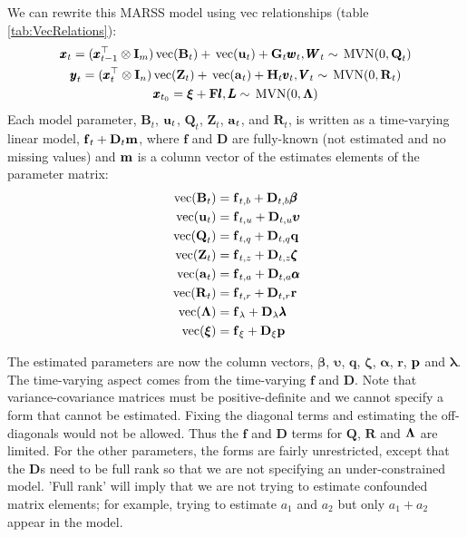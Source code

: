 \documentclass[]{article}
\def\uupsilon{\pmb{\upsilon}}
\def\llambda{\pmb{\lambda}}
\def\bbeta{\pmb{\beta}}
\def\aalpha{\pmb{\alpha}}
\def\zzeta{\pmb{\zeta}}
\def\xixi{\mbox{\boldmath $\xi$}}
\def\LAM{\mbox{\boldmath $\Lambda$}}
\def\ZZ{\mbox{$\mathbf Z$}}	\def\zz{\mbox{$\mathbf z$}}
\def\BB{\mbox{$\mathbf B$}}	\def\bb{\mbox{$\mathbf b$}}
\def\DD{\mbox{$\mathbf D$}}	\def\dd{\mbox{$\mathbf d$}}
\def\FF{\mbox{$\mathbf F$}} \def\ff{\mbox{$\mathbf f$}}
\def\GG{\mbox{$\mathbf G$}}	\def\gg{\mbox{$\mathbf g$}}
\def\HH{\mbox{$\mathbf H$}}	\def\hh{\mbox{$\mathbf h$}}
\def\II{\mbox{$\mathbf I$}} \def\ii{\mbox{$\mathbf i$}}
\def\QQ{\mbox{$\mathbf Q$}}	 \def\qq{\mbox{$\mathbf q$}}
\def\RR{\mbox{$\mathbf R$}}	 \def\rr{\mbox{$\mathbf r$}}
\def\VV{\mbox{$\pmb{V}$}}	\def\vv{\mbox{$\pmb{v}$}}
\def\WW{\mbox{$\pmb{W}$}}	\def\ww{\mbox{$\pmb{w}$}}
\def\LL{\mbox{$\pmb{L}$}}	\def\ll{\mbox{$\pmb{l}$}}
\def\vec{\,\textup{\textrm{vec}}}
\def\MVN{\,\textup{\textrm{MVN}}}
\begin{document}
We can rewrite this MARSS model using vec relationships (table \ref{tab:VecRelations}):
\begin{equation}\label{eq:MARSS.ex.vec}
\begin{gathered}
\xx_t = (\xx_{t-1}^\top \otimes \II_m)\vec(\BB_t) + \vec(\uu_t) + \GG_t\ww_t, \WW_t  \sim \MVN(0,\QQ_t)\\
\yy_t = (\xx_t^\top \otimes \II_n)\vec(\ZZ_t) + \vec(\aa_t) + \HH_t\vv_t, \VV_t \sim \MVN(0,\RR_t)\\
\xx_{t_0} = \xixi+\FF\ll, \LL \sim \MVN(0,\LAM)
\end{gathered}
\end{equation}
Each model parameter, $\BB_t$, $\uu_t$, $\QQ_t$, $\ZZ_t$, $\aa_t$, and $\RR_t$, is written as a time-varying linear model, $\ff_t+\DD_t\mm$, where $\ff$ and $\DD$ are fully-known (not estimated and no missing values) and $\mm$ is a column vector of the estimates elements of the parameter matrix:
\begin{equation}\label{eq:MARSS.ex.vec.2}
\begin{split}
\vec(\BB_t) &= \ff_{t,b} + \DD_{t,b}\bbeta\\
\vec(\uu_t) &= \ff_{t,u} + \DD_{t,u}\uupsilon\\
\vec(\QQ_t) &= \ff_{t,q} + \DD_{t,q}\qq\\
\vec(\ZZ_t) &= \ff_{t,z} + \DD_{t,z}\zzeta\\
\vec(\aa_t) &= \ff_{t,a} + \DD_{t,a}\aalpha\\
\vec(\RR_t) &= \ff_{t,r} + \DD_{t,r}\rr\\
\vec(\LAM)&= \ff_\lambda+\DD_\lambda\llambda \\
\vec(\xixi)&= \ff_\xi+\DD_\xi\pp
\end{split}
\end{equation}

The estimated parameters are now the column vectors, $\bbeta$, $\uupsilon$, $\qq$, $\zzeta$, $\aalpha$, $\rr$, $\pp$ and $\llambda$.  The time-varying aspect comes from the time-varying $\ff$ and $\DD$.  Note that variance-covariance matrices must be positive-definite and we cannot specify a form that cannot be estimated.  Fixing the diagonal terms and estimating the off-diagonals would not be allowed.  Thus the $\ff$ and $\DD$ terms for $\QQ$, $\RR$ and $\LAM$ are limited.  For the other parameters, the forms are fairly unrestricted, except that the $\DD$s need to be full rank so that we are not specifying an under-constrained model.  'Full rank' will imply that we are not trying to estimate confounded matrix elements; for example, trying to estimate $a_1$ and $a_2$ but only $a_1+a_2$ appear in the model.
\end{document}
